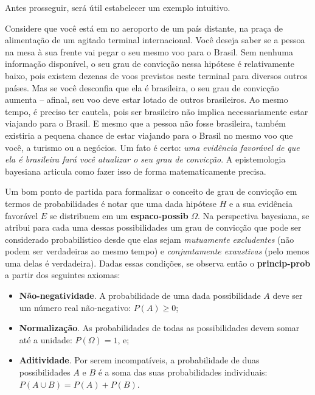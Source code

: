 \documentclass[./main.tex]{subfiles}
\begin{document}
\par Antes prosseguir, será útil estabelecer um exemplo intuitivo. 

\par Considere que você está em no aeroporto de um país distante, na praça de alimentação de um agitado terminal internacional. Você deseja saber se a pessoa na mesa à sua frente vai pegar o seu mesmo voo para o Brasil. Sem nenhuma informação disponível, o seu grau de convicção nessa hipótese é relativamente baixo, pois existem dezenas de voos previstos neste terminal para diversos outros países. Mas se você desconfia que ela é brasileira, o seu grau de convicção aumenta – afinal, seu voo deve estar lotado de outros brasileiros. Ao mesmo tempo, é preciso ter cautela, pois ser brasileiro não implica necessariamente estar viajando para o Brasil. E mesmo que a pessoa não fosse brasileira, também existiria a pequena chance de estar viajando para o Brasil no mesmo voo que você, a turismo ou a negócios. Um fato é certo: \textit{uma evidência favorável de que ela é brasileira fará você atualizar o seu grau de convicção}. A epistemologia bayesiana articula como fazer isso de forma matematicamente precisa.

\par Um bom ponto de partida para formalizar o conceito de grau de convicção em termos de probabilidades é notar que uma dada hipótese $H$ e a sua evidência favorável $E$ se distribuem em um \textbf{\gls{espaco-possib}} $\Omega$. Na perspectiva bayesiana, se atribui para cada uma dessas possibilidades um grau de convicção que pode ser considerado probabilístico desde que elas sejam \textit{mutuamente excludentes} (não podem ser verdadeiras ao mesmo tempo) e \textit{conjuntamente exaustivas} (pelo menos uma delas é verdadeira). Dadas essas condições, se observa então o \textbf{\gls{princip-prob}} a partir dos seguintes axiomas:
\begin{itemize}
    \item \textbf{Não-negatividade}. A probabilidade de uma dada possibilidade $A$ deve ser um número real não-negativo: $P(A) \geq 0$;
    \item \textbf{Normalização}. As probabilidades de todas as possibilidades devem somar até a unidade: $P(\Omega) = 1$, e;
    \item \textbf{Aditividade}. Por serem incompatíveis, a probabilidade de duas possibilidades $A$ e $B$ é a soma das suas probabilidades individuais: $P(A \cup B ) = P(A) + P(B)$.
\end{itemize}
\end{document}
